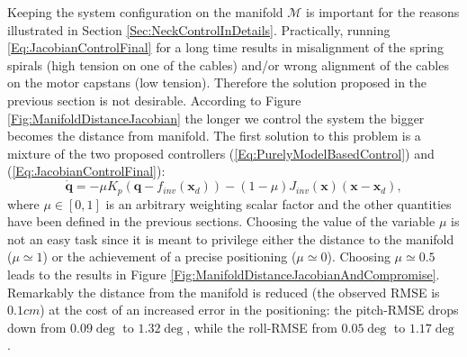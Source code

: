 \documentclass[conference]{IEEEtran}
\numberwithin{equation}{section}
\newcommand{\q}{\mathbf{q}}
\newcommand{\x}{\mathbf{x}}
\begin{document}
Keeping the system configuration on the manifold $\mathcal M$ is important for the reasons illustrated in Section \ref{Sec:NeckControlInDetails}.
Practically, running \eqref{Eq:JacobianControlFinal} for a long time results in misalignment of the spring spirals (high tension on one of the cables) and/or wrong alignment of the cables on the motor capstans (low tension). Therefore the solution proposed in the previous section is not desirable. According to Figure 
\ref{Fig:ManifoldDistanceJacobian} the longer we control the system the bigger becomes the distance from manifold. The first solution to this problem is a mixture of the two proposed controllers (\ref{Eq:PurelyModelBasedControl}) and (\ref{Eq:JacobianControlFinal}):
\begin{equation} \label{Eq:WeightedControl}
\dot{\q} = -\mu K_p(\q - f_{inv}(\x_d)) - (1-\mu) J_{inv}(\x) (\x - \x_d),
\end{equation}
where $\mu \in [0, 1]$ is an arbitrary weighting scalar factor and the other quantities have been defined in the previous sections. Choosing the value of the variable $\mu$ is not an easy task since it is meant to privilege either the distance to the manifold ($\mu \simeq 1$) or the achievement of a precise positioning ($\mu \simeq 0$). Choosing $\mu \simeq 0.5$ leads to the results in Figure \ref{Fig:ManifoldDistanceJacobianAndCompromise}. Remarkably the distance from the manifold is reduced (the observed RMSE is $0.1cm$) at the cost of an increased error in the positioning: the pitch-RMSE drops down from $0.09 \deg$ to $1.32 \deg$, while the roll-RMSE from $0.05 \deg$ to $1.17 \deg$.
\end{document}
